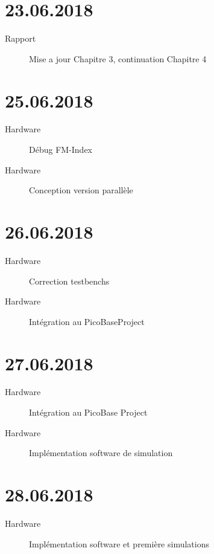 \section*{23.06.2018}

\begin{description}
	\item [Rapport] Mise a jour Chapitre 3, continuation Chapitre 4
\end{description}

\section*{25.06.2018}

\begin{description}
	\item [Hardware] Débug FM-Index
	\item [Hardware] Conception version parallèle
\end{description}

\section*{26.06.2018}

\begin{description}
    \item [Hardware] Correction testbenchs
	\item [Hardware] Intégration au PicoBaseProject
	\end{description}

\section*{27.06.2018}

\begin{description}
	\item [Hardware] Intégration au PicoBase Project
	\item [Hardware] Implémentation software de simulation
\end{description}

\section*{28.06.2018}

\begin{description}
	\item [Hardware] Implémentation software et première simulations
\end{description}

